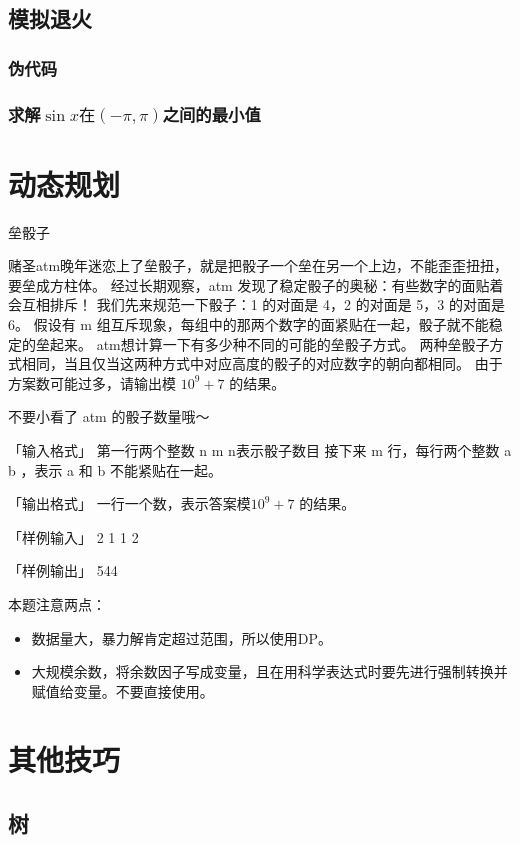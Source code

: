 \documentclass[a4paper]{article}
\begin{document}
	\subsection{模拟退火}
	\subsubsection{伪代码}
	
	\subsubsection{求解$\sin x在(-\pi,\pi)$之间的最小值}
	
	
	\section{动态规划}
	
	垒骰子
	
	赌圣atm晚年迷恋上了垒骰子，就是把骰子一个垒在另一个上边，不能歪歪扭扭，要垒成方柱体。
	经过长期观察，atm 发现了稳定骰子的奥秘：有些数字的面贴着会互相排斥！
	我们先来规范一下骰子：1 的对面是 4，2 的对面是 5，3 的对面是 6。
	假设有 m 组互斥现象，每组中的那两个数字的面紧贴在一起，骰子就不能稳定的垒起来。 atm想计算一下有多少种不同的可能的垒骰子方式。
	两种垒骰子方式相同，当且仅当这两种方式中对应高度的骰子的对应数字的朝向都相同。
	由于方案数可能过多，请输出模 $ 10^9 + 7 $ 的结果。
	
	不要小看了 atm 的骰子数量哦～
	
	「输入格式」
	第一行两个整数 n m
	n表示骰子数目
	接下来 m 行，每行两个整数 a b ，表示 a 和 b 不能紧贴在一起。
	
	「输出格式」
	一行一个数，表示答案模$  10^9 + 7 $ 的结果。
	
	「样例输入」
	2 1
	1 2

	「样例输出」
	544
	
	本题注意两点：
	\begin{itemize}
		\item 数据量大，暴力解肯定超过范围，所以使用DP。
		\item 大规模余数，将余数因子写成变量，且在用科学表达式时要先进行强制转换并赋值给变量。不要直接使用。
	\end{itemize}
	
	
	
	\section{其他技巧}
	\subsection{树}
\end{document}
